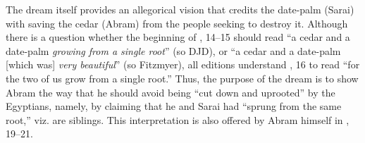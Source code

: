 The dream itself provides an allegorical vision that credits the date-palm (Sarai) with saving the cedar (Abram) from the people seeking to destroy it. Although there is a question whether the beginning of , 14--15 should read  ``a cedar and a date-palm \emph{growing from a single root}'' (so DJD), or  ``a cedar and a date-palm [which was] \emph{very beautiful}'' (so Fitzmyer), all editions understand , 16 to read  ``for the two of us grow from a single root.'' Thus, the purpose of the dream  is to show Abram the way that he should avoid being ``cut down and uprooted'' by the Egyptians, namely, by claiming that he and Sarai had ``sprung from the same root,'' viz. are siblings. This interpretation is also offered by Abram himself in , 19--21.

